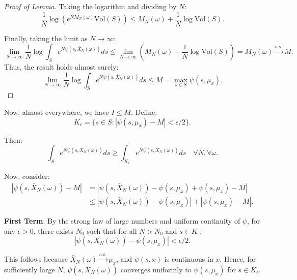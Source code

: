 \documentclass{article}
\theoremstyle{plain}
\theoremstyle{definition}
\theoremstyle{remark}
\begin{document}
\begin{proof}[Proof of Lemma]
Taking the logarithm and dividing by $N$:
\begin{equation}
\frac{1}{N} \log \left(e^{N M_N(\omega)} \text{Vol}(S)\right) \leq M_N(\omega) + \frac{1}{N} \log \text{Vol}(S).
\end{equation}

Finally, taking the limit as $N \to \infty$:
\begin{equation}
\lim_{N \to \infty} \frac{1}{N} \log \int_S e^{N \psi(s, \bar{X}_N(\omega))} ds \leq \lim_{N \to \infty} \left(M_N(\omega) + \frac{1}{N} \log \text{Vol}(S)\right) = M_N(\omega) \xrightarrow{\text{a.s.}} M.
\end{equation}
Thus, the result holds almost surely:
\begin{equation}
\lim_{N \to \infty} \frac{1}{N} \log \int_S e^{N \psi(s, \bar{X}_N(\omega))} ds \leq M = \max_{s \in S} \psi(s, \mu_x).
\end{equation}
\end{proof}

Now, almost everywhere, we have $ I \leq M $. Define:
\begin{equation}
K_\epsilon = \{s \in S : |\psi(s, \mu_x) - M| < \epsilon/2\}.
\end{equation}

Then:
\begin{equation}
\int_S e^{N \psi(s, \bar{X}_N(\omega))} ds \geq \int_{K_\epsilon} e^{N \psi(s, \bar{X}_N(\omega))} ds \quad \forall N, \forall \omega.
\end{equation}

Now, consider:
\begin{align}
|\psi(s, \bar{X}_N(\omega)) - M| 
&= |\psi(s, \bar{X}_N(\omega)) - \psi(s, \mu_x) + \psi(s, \mu_x) - M| \\
&\leq |\psi(s, \bar{X}_N(\omega)) - \psi(s, \mu_x)| + |\psi(s, \mu_x) - M|.
\end{align}

\textbf{First Term}: By the strong law of large numbers and uniform continuity of $\psi$, for any $\epsilon > 0$, there exists $N_0$ such that for all $N > N_0$ and $s \in K_\epsilon$:
\begin{equation}
|\psi(s, \bar{X}_N(\omega)) - \psi(s, \mu_x)| < \epsilon/2.
\end{equation}

This follows because $\bar{X}_N(\omega) \xrightarrow{\text{a.s.}} \mu_x$, and $\psi(s, x)$ is continuous in $x$. Hence, for sufficiently large $N$, $\psi(s, \bar{X}_N(\omega))$ converges uniformly to $\psi(s, \mu_x)$ for $s \in K_\epsilon$.
\end{document}
